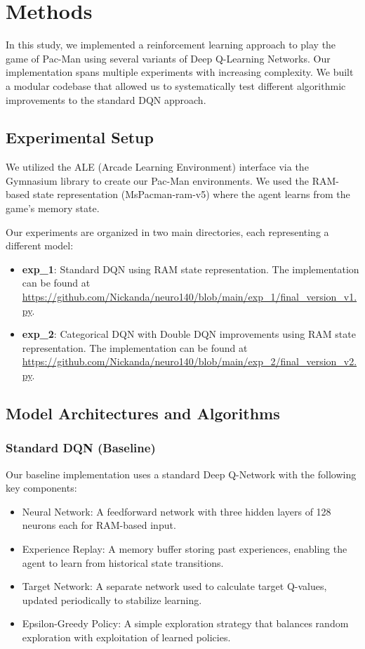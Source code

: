 \documentclass{article} %
\begin{document}
\section{Methods}

In this study, we implemented a reinforcement learning approach to play the game of Pac-Man using several variants of Deep Q-Learning Networks. Our implementation spans multiple experiments with increasing complexity. We built a modular codebase that allowed us to systematically test different algorithmic improvements to the standard DQN approach.

\subsection{Experimental Setup}

We utilized the ALE (Arcade Learning Environment) interface via the Gymnasium library to create our Pac-Man environments. We used the RAM-based state representation (MsPacman-ram-v5) where the agent learns from the game's memory state.

Our experiments are organized in two main directories, each representing a different model:
\begin{itemize}
  \item \textbf{exp\_1}: Standard DQN using RAM state representation. The implementation can be found at \url{https://github.com/Nickanda/neuro140/blob/main/exp_1/final_version_v1.py}.
  \item \textbf{exp\_2}: Categorical DQN with Double DQN improvements using RAM state representation. The implementation can be found at \url{https://github.com/Nickanda/neuro140/blob/main/exp_2/final_version_v2.py}.
\end{itemize}

\subsection{Model Architectures and Algorithms}

\subsubsection{Standard DQN (Baseline)}

Our baseline implementation uses a standard Deep Q-Network with the following key components:
\begin{itemize}
  \item Neural Network: A feedforward network with three hidden layers of 128 neurons each for RAM-based input.
  \item Experience Replay: A memory buffer storing past experiences, enabling the agent to learn from historical state transitions.
  \item Target Network: A separate network used to calculate target Q-values, updated periodically to stabilize learning.
  \item Epsilon-Greedy Policy: A simple exploration strategy that balances random exploration with exploitation of learned policies.
\end{itemize}
\end{document}
